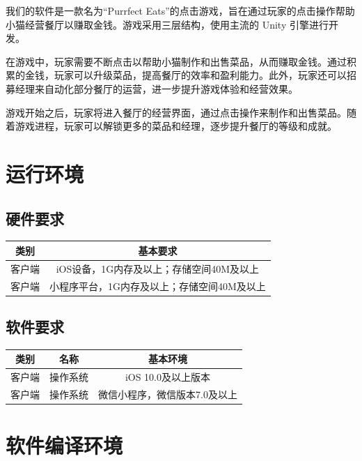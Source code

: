 \documentclass{mancls}%
\begin{document}
我们的软件是一款名为“Purrfect Eats”的点击游戏，旨在通过玩家的点击操作帮助小猫经营餐厅以赚取金钱。游戏采用三层结构，使用主流的 Unity 引擎进行开发。

在游戏中，玩家需要不断点击以帮助小猫制作和出售菜品，从而赚取金钱。通过积累的金钱，玩家可以升级菜品，提高餐厅的效率和盈利能力。此外，玩家还可以招募经理来自动化部分餐厅的运营，进一步提升游戏体验和经营效果。

游戏开始之后，玩家将进入餐厅的经营界面，通过点击操作来制作和出售菜品。随着游戏进程，玩家可以解锁更多的菜品和经理，逐步提升餐厅的等级和成就。

\pagebreak

\section{运行环境}
\subsection{硬件要求}
\begin{longtable}{|c|c|}
  \hline
  类别  & 基本要求                     \\
  \hline
  客户端 & iOS设备，1G内存及以上；存储空间40M及以上 \\
  \hline
  客户端 & 小程序平台，1G内存及以上；存储空间40M及以上 \\
  \hline
\end{longtable}

\vspace{1cm}

\subsection{软件要求}
\begin{longtable}{|c|c|c|}
  \hline
  类别  & 名称   & 基本环境             \\
  \hline
  客户端 & 操作系统 & iOS 10.0及以上版本    \\
  \hline
  客户端 & 操作系统 & 微信小程序，微信版本7.0及以上 \\
  \hline
\end{longtable}
\pagebreak
\section{软件编译环境}
\end{document}
